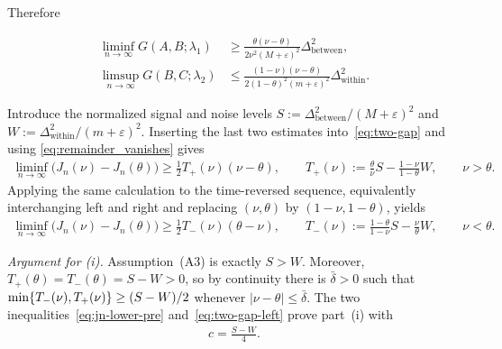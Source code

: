 \documentclass[10pt, letterpaper]{amsart}
\newif\ifwidedisplays
\def\min{{\rm min}}
\begin{document}
Therefore
\ifwidedisplays
\[
\liminf_{n\to\infty}G(A,B;\lambda_1)
\geq
\frac{\theta(\nu-\theta)}{2\nu^2(M+\varepsilon)^2}
\Delta_{\mathrm{between}}^2,
\qquad
\limsup_{n\to\infty}G(B,C;\lambda_2)
\leq
\frac{(1-\nu)(\nu-\theta)}{2(1-\theta)^2(m+\varepsilon)^2}
\Delta_{\mathrm{within}}^2.
\]
\else
\begin{align*}
\liminf_{n\to\infty}G(A,B;\lambda_1)
&\geq
\frac{\theta(\nu-\theta)}{2\nu^2(M+\varepsilon)^2}
\Delta_{\mathrm{between}}^2,\\
\limsup_{n\to\infty}G(B,C;\lambda_2)
&\leq
\frac{(1-\nu)(\nu-\theta)}{2(1-\theta)^2(m+\varepsilon)^2}
\Delta_{\mathrm{within}}^2.
\end{align*}
\fi
Introduce the normalized signal and noise levels
$S:=\Delta_{\mathrm{between}}^2/(M+\varepsilon)^2$ and
$W:=\Delta_{\mathrm{within}}^2/(m+\varepsilon)^2$.
Inserting the last two estimates into~\eqref{eq:two-gap} and using
\eqref{eq:remainder_vanishes} gives
\begin{align}\label{eq:jn-lower-pre}
\liminf_{n\to\infty}\bigl(J_n(\nu)-J_n(\theta)\bigr)
\geq\frac12 T_+(\nu)(\nu-\theta),
\qquad
T_+(\nu):=\frac{\theta}{\nu}S-\frac{1-\nu}{1-\theta}W,
\qquad \nu>\theta.
\end{align}
Applying the same calculation to the time-reversed sequence, equivalently
interchanging left and right and replacing $(\nu,\theta)$ by
$(1-\nu,1-\theta)$, yields
\begin{align}\label{eq:two-gap-left}
\liminf_{n\to\infty}\bigl(J_n(\nu)-J_n(\theta)\bigr)
\geq\frac12 T_-(\nu)(\theta-\nu),
\qquad
T_-(\nu):=\frac{1-\theta}{1-\nu}S-\frac{\nu}{\theta}W,
\qquad \nu<\theta.
\end{align}

\medskip
\noindent\emph{Argument for (i).}
Assumption~(A3) is exactly $S>W$. Moreover, $T_+(\theta)=T_-(\theta)=S-W>0$, so by continuity there is $\bar\delta>0$ such that $\min\{T_-(\nu),T_+(\nu)\}\geq(S-W)/2$ whenever $|\nu-\theta|\leq\bar\delta$.
The two inequalities~\eqref{eq:jn-lower-pre} and~\eqref{eq:two-gap-left} prove part~(i)
with
\begin{align}\label{eq:const_local}
c=\frac{S-W}{4}.
\end{align}
\end{document}
